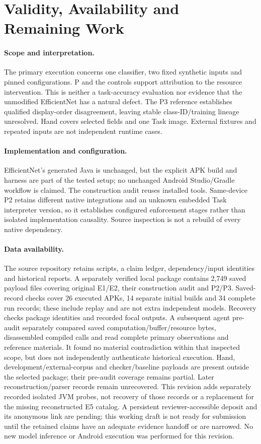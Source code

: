 \documentclass[10pt,conference]{IEEEtran}
\begin{document}
\section{Validity, Availability and Remaining Work}
\label{sec:validity}
\paragraph{Scope and interpretation.}
The primary execution concerns one classifier, two fixed synthetic inputs and pinned configurations. P and the controls support attribution to the resource intervention. This is neither a task-accuracy evaluation nor evidence that the unmodified EfficientNet has a natural defect. The P3 reference establishes qualified display-order disagreement, leaving stable class-ID/training lineage unresolved. Hand covers selected fields and one Task image. External fixtures and repeated inputs are not independent runtime cases.

\paragraph{Implementation and configuration.}
EfficientNet's generated Java is unchanged, but the explicit APK build and harness are part of the tested setup; no unchanged Android Studio/Gradle workflow is claimed. The construction audit reuses installed tools. Same-device P2 retains different native integrations and an unknown embedded Task interpreter version, so it establishes configured enforcement stages rather than isolated implementation causality. Source inspection is not a rebuild of every native dependency.

\paragraph{Data availability.}
The source repository retains scripts, a claim ledger, dependency/input identities and historical reports. A separately verified local package contains 2,749 saved payload files covering original E1/E2, their construction audit and P2/P3. Saved-record checks cover 26 executed APKs, 14 separate initial builds and 34 complete run records; these include replay and are not extra independent models. Recovery checks package identities and recorded focal outputs. A subsequent agent pre-audit separately compared saved computation/buffer/resource bytes, disassembled compiled calls and read complete primary observations and reference materials. It found no material contradiction within that inspected scope, but does not independently authenticate historical execution. Hand, development/external-corpus and checker/baseline payloads are present outside the selected package; their pre-audit coverage remains partial. Later reconstruction/parser records remain unrecovered. This revision adds separately recorded isolated JVM probes, not recovery of those records or a replacement for the missing reconstructed E5 catalog. A persistent reviewer-accessible deposit and its anonymous link are pending; this working draft is not ready for submission until the retained claims have an adequate evidence handoff or are narrowed. No new model inference or Android execution was performed for this revision.
\end{document}
